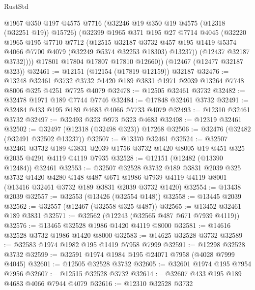 \begin{lexlean}{RustStd}
\begin{coremodule}
            @1967
            @350
            @197
            @4575
            @7716
            (@32246 @19 @350 @19 @4575 (@12318 (@32251 @19)) @15726)
            (@32399
              @1965
              @371
              @195
              @27
              @7714
              @4045
              (@32220
                @1965
                @195
                @7710
                @7712
                (@12515
                  @32187
                  @3732
                  @457
                  @195
                  @1419
                  @5374
                  @4066
                  @7700
                  @4079
                  (@32249 @5374 @32253 @18303)
                  @13237))
              (@12437 @32187 @3732))))
        @17801
        @17804
        @17807
        @17810
        @12660))
    (@12467 (@12477 @32187 @323))
@32461 := @12151 (@12154 (@17819 @12159)) @32187
@32476 := @13248
    @32461
    @3732
    @3732
    @1420
    @189
    @3831
    @1971
    @2039
    @13264
    @7748
    @8006
    @325
    @4251
    @7725
    @4079
@32478 := @12505 @32461 @3732
@32482 := @32478 @1971 @189 @7744 @7746
@32484 := @17848 @32461 @3732
@32491 := @32484 @433 @195 @189 @4683 @4066 @7733 @4079
@32493 := @12310 @32461 @3732
@32497 := @32493 @323 @973 @323 @4683
@32498 := @12319 @32461
@32502 := @32497 (@12318 (@32498 @323)) @17268
@32506 := @32476 (@32482 (@32491 @32502 @13237))
@32507 := @13370 @32461
@32524 := @32507
    @32461
    @3732
    @189
    @3831
    @2039
    @1756
    @3732
    @1420
    @8005
    @19
    @451
    @325
    @2035
    @4291
    @4119
    @4119
    @7935
@32528 := @12151 (@12482 (@13390 @12484)) @32461
@32553 := @32507
    @32528
    @3732
    @189
    @3831
    @2039
    @325
    @3732
    @1420
    @4280
    @148
    @487
    @671
    @1986
    @7939
    @4119
    @4119
    @8001
    (@13416 @32461 @3732 @189 @3831 @2039 @3732 @1420)
@32554 := @13438 @2039
@32557 := @32553 (@13426 (@32554 @148))
@32558 := @13445 @2039
@32562 := @32557 (@12467 (@32558 @325 @487))
@32565 := @13452 @32461 @189 @3831
@32571 := @32562 (@12243 (@32565 @487 @671 @7939 @4119))
@32576 := @13465 @32528 @1986 @1420 @4119 @8000
@32581 := @14616 @32528 @3732 @1986 @1420 @8000
@32583 := @14625 @32528 @3732
@32589 := @32583 @1974 @1982 @195 @1419 @7958 @7999
@32591 := @12298 @32528 @3732
@32599 := @32591 @1974 @1984 @195 @24071 @7958 (@4028 @7999 @4045)
@32601 := @12505 @32528 @3732
@32605 := @32601 @1974 @195 @7954 @7956
@32607 := @12515 @32528 @3732
@32614 := @32607 @433 @195 @189 @4683 @4066 @7944 @4079
@32616 := @12310 @32528 @3732

\end{coremodule}
\end{lexlean}
